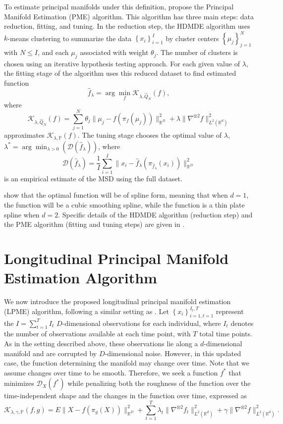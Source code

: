 \documentclass[11pt,reqno]{article}
\theoremstyle{definition}
\begin{document}
To estimate principal manifolds under this definition, \cite{mengPrincipalManifoldEstimation2021} propose the Principal Manifold Estimation (PME) algorithm. This algorithm has three main steps: data reduction, fitting, and tuning. In the reduction step, the HDMDE algorithm uses $k$-means clustering to summarize the data $\left\{x_i\right\}_{i=1}^{I}$ by cluster centers $\left\{\mu_j\right\}_{j=1}^{N}$ with $N \leq I$, and each $\mu_j$ associated with weight $\theta_j$. The number of clusters is chosen using an iterative hypothesis testing approach. For each given value of $\lambda$, the fitting stage of the algorithm uses this reduced dataset to find estimated function 
\[%
  \hat{f}_\lambda = \arg\min_f \mathcal{K}_{\lambda, \hat{Q}_N}(f)
,\]%
where 
\[%
  \mathcal{K}_{\lambda, \hat{Q}_N}(f) = \sum_{j = 1}^{N}\theta_j \|\mu_j - f(\pi_f(\mu_j))\|_{\mathbb{R}^{D}}^2 + \lambda\|\nabla^{\otimes 2}f\|_{L^2(\mathbb{R}^{d})}^2
\]%
approximates $\mathcal{K}_{\lambda, \mathbb{P}}(f)$. The tuning stage chooses the optimal value of $\lambda$, $\lambda^{*} = \arg\min_{\lambda > 0}(\mathcal{D}(\hat{f}_\lambda))$, where 
\[%
  \mathcal{D}(\hat{f}_\lambda) = \frac{1}{I}\sum_{i=1}^{I}\|x_i - \hat{f}_\lambda(\pi_{\hat{f}_\lambda}(x_i))\|_{\mathbb{R}^{D}}^2
\]%
is an empirical estimate of the MSD using the full dataset.

\cite{mengPrincipalManifoldEstimation2021} show that the optimal function will be of spline form, meaning that when $d = 1$, the function will be a cubic smoothing spline, while the function is a thin plate spline when $d = 2$. Specific details of the HDMDE algorithm (reduction step) and the PME algorithm (fitting and tuning steps) are given in \cite{mengPrincipalManifoldEstimation2021}.

\section{Longitudinal Principal Manifold Estimation Algorithm}

We now introduce the proposed longitudinal principal manifold estimation (LPME) algorithm, following a similar setting as \cite{mengPrincipalManifoldEstimation2021}. Let $\left\{x_i\right\}_{i=1, t=1}^{I_t, T}$ represent the $I = \sum_{t=1}^{T}I_t$ $D$-dimensional observations for each individual, where $I_t$ denotes the number of observations available at each time point, with $T$ total time points. As in the setting described above, these observations lie along a $d$-dimensional manifold and are corrupted by $D$-dimensional noise. However, in this updated case, the function determining the manifold may change over time. Note that we assume changes over time to be smooth. Therefore, we seek a function $f^{*}$ that minimizes $\mathcal{D}_X(f^{*})$ while penalizing both the roughness of the function over the time-independent shape and the changes in the function over time, expressed as 
\[%
  \mathcal{K}_{\lambda, \gamma, \mathbb{P}}(f, g) = E\|X - f(\pi_g(X))\|_{\mathbb{R}^{D}}^2 + \sum_{t=1}^{T} \lambda_t \|\nabla^{\otimes 2}f_t\|_{L^2(\mathbb{R}^{d})}^2 + \gamma\|\nabla^{\otimes 2}f\|_{L^2(\mathbb{R}^d)}^2
.\]%
\end{document}
